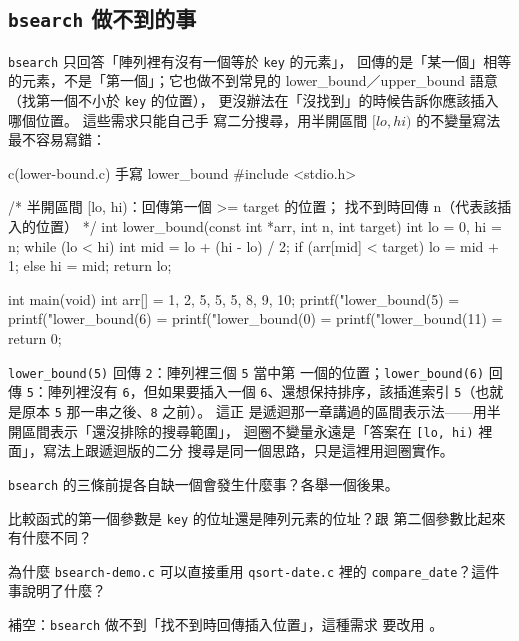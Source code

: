 \subsection{\texttt{bsearch} 做不到的事}

\texttt{bsearch} 只回答「陣列裡有沒有一個等於 \texttt{key} 的元素」，
回傳的是「某一個」相等的元素，不是「第一個」；它也做不到常見的
lower\_bound／upper\_bound 語意（找第一個不小於 \texttt{key} 的位置），
更沒辦法在「沒找到」的時候告訴你應該插入哪個位置。 這些需求只能自己手
寫二分搜尋，用半開區間 $[lo, hi)$ 的不變量寫法最不容易寫錯：

\begin{example}{c}{(lower-bound.c) 手寫 lower\_bound}
#include <stdio.h>

/* 半開區間 [lo, hi)：回傳第一個 >= target 的位置；
   找不到時回傳 n（代表該插入的位置） */
int lower_bound(const int *arr, int n, int target) {
    int lo = 0, hi = n;
    while (lo < hi) {
        int mid = lo + (hi - lo) / 2;
        if (arr[mid] < target) lo = mid + 1;
        else hi = mid;
    }
    return lo;
}

int main(void) {
    int arr[] = {1, 2, 5, 5, 5, 8, 9, 10};
    printf("lower_bound(5) = %
    printf("lower_bound(6) = %
    printf("lower_bound(0) = %
    printf("lower_bound(11) = %
    return 0;
}
\end{example}


\texttt{lower\_bound(5)} 回傳 \texttt{2}：陣列裡三個 \texttt{5} 當中第
一個的位置；\texttt{lower\_bound(6)} 回傳 \texttt{5}：陣列裡沒有
\texttt{6}，但如果要插入一個 \texttt{6}、還想保持排序，該插進索引
\texttt{5}（也就是原本 \texttt{5} 那一串之後、\texttt{8} 之前）。 這正
是遞迴那一章講過的區間表示法——用半開區間表示「還沒排除的搜尋範圍」，
迴圈不變量永遠是「答案在 \texttt{[lo, hi)} 裡面」，寫法上跟遞迴版的二分
搜尋是同一個思路，只是這裡用迴圈實作。


\begin{drills}[label=drills:sl-bsearch]
\item \texttt{bsearch} 的三條前提各自缺一個會發生什麼事？各舉一個後果。
\item 比較函式的第一個參數是 \texttt{key} 的位址還是陣列元素的位址？跟
第二個參數比起來有什麼不同？
\item 為什麼 \texttt{bsearch-demo.c} 可以直接重用
\texttt{qsort-date.c} 裡的 \texttt{compare\_date}？這件事說明了什麼？
\item 補空：\texttt{bsearch} 做不到「找不到時回傳插入位置」，這種需求
要改用 \underline{\hspace{2em}}。
\end{drills}

